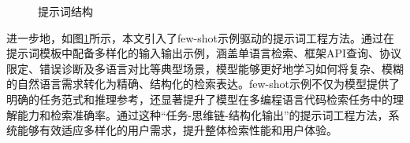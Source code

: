 \documentclass[UTF8,a4paper,12pt]{ctexart}
\numberwithin{equation}{section}
\begin{document}
\begin{figure}[H]
	\caption{提示词结构}
	\label{prompt2}
\end{figure}
进一步地，如图\ref{prompt2}所示，本文引入了few-shot示例驱动的提示词工程方法。通过在提示词模板中配备多样化的输入输出示例，涵盖单语言检索、框架API查询、协议限定、错误诊断及多语言对比等典型场景，模型能够更好地学习如何将复杂、模糊的自然语言需求转化为精确、结构化的检索表达。few-shot示例不仅为模型提供了明确的任务范式和推理参考，还显著提升了模型在多编程语言代码检索任务中的理解能力和检索准确率。通过这种“任务-思维链-结构化输出”的提示词工程方法，系统能够有效适应多样化的用户需求，提升整体检索性能和用户体验。
\end{document}
